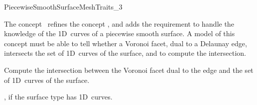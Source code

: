 
\begin{ccRefConcept}{PiecewiseSmoothSurfaceMeshTraits_3}

\ccDefinition
  
The concept \ccRefName\ refines the concept , and
adds the requirement to handle the knowledge of the 1D~curves of a
piecewise smooth surface. A model of this concept must be able to tell
whether a Voronoi facet, dual to a Delaunay edge, intersects the set of
1D~curves of the surface, and to compute the intersection.

\ccGeneralizes
{}

\ccTypes


{}  %


{ Compute the intersection between the Voronoi facet dual to the edge
   and the set of 1D~curves of the surface. }

\ccHasModels

, if the surface type
 has 1D~curves.

\ccSeeAlso
{}\\

\end{ccRefConcept}



